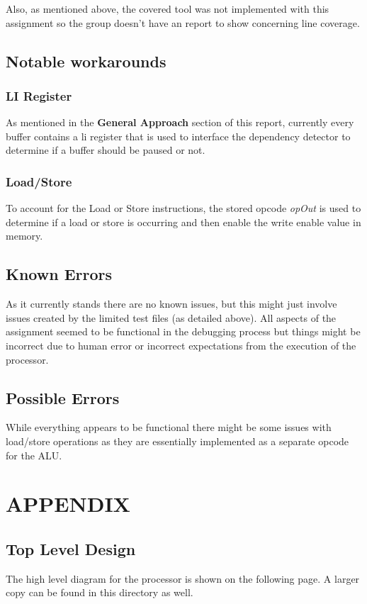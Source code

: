 \documentclass[conference]{IEEEtran}
\begin{document}
Also, as mentioned above, the covered tool was not implemented with this assignment so 
the group doesn't have an report to show concerning line coverage. 

\subsection{Notable workarounds}
\subsubsection{LI Register }
As mentioned in the \textbf{General Approach} section of this report, currently 
every buffer contains a li register that is used to interface the dependency detector
to determine if a buffer should be paused or not. 
\subsubsection{Load/Store}
To account for the Load or Store instructions, the stored opcode \textit{opOut} is 
used to determine if a load or store is occurring and then enable the write enable
value in memory. 

\subsection{Known Errors}
As it currently stands there are no known issues, but this might just involve issues 
created by the limited test files (as detailed above). All aspects of the assignment
seemed to be functional in the debugging process but things might be incorrect due
to human error or incorrect expectations from the execution of the processor.

\subsection{Possible Errors}
While everything appears to be functional there might be some issues with load/store
 operations as they are essentially implemented as a separate opcode for the ALU. 


\section{APPENDIX}
\subsection{Top Level Design}
The high level diagram for the processor is shown on the following page. A larger copy can be found in this directory as well. 
\end{document}
